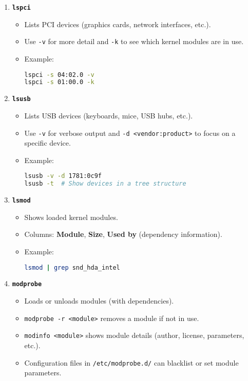 \documentclass[12pt,a4paper]{report}
\begin{document}
\begin{enumerate}
    \item \textbf{\texttt{lspci}}
    \begin{itemize}
        \item Lists PCI devices (graphics cards, network interfaces, etc.).
        \item Use \texttt{-v} for more detail and \texttt{-k} to see which kernel modules are in use.
        \item Example:
        \begin{lstlisting}[language=bash]
lspci -s 04:02.0 -v
lspci -s 01:00.0 -k
        \end{lstlisting}
    \end{itemize}

    \item \textbf{\texttt{lsusb}}
    \begin{itemize}
        \item Lists USB devices (keyboards, mice, USB hubs, etc.).
        \item Use \texttt{-v} for verbose output and \texttt{-d <vendor:product>} to focus on a specific device.
        \item Example:
        \begin{lstlisting}[language=bash]
lsusb -v -d 1781:0c9f
lsusb -t  # Show devices in a tree structure
        \end{lstlisting}
    \end{itemize}

    \item \textbf{\texttt{lsmod}}
    \begin{itemize}
        \item Shows loaded kernel modules.
        \item Columns: \textbf{Module}, \textbf{Size}, \textbf{Used by} (dependency information).
        \item Example:
        \begin{lstlisting}[language=bash]
lsmod | grep snd_hda_intel
        \end{lstlisting}
    \end{itemize}

    \item \textbf{\texttt{modprobe}}
    \begin{itemize}
        \item Loads or unloads modules (with dependencies).
        \item \texttt{modprobe -r <module>} removes a module if not in use.
        \item \texttt{modinfo <module>} shows module details (author, license, parameters, etc.).
        \item Configuration files in \texttt{/etc/modprobe.d/} can blacklist or set module parameters.
    \end{itemize}
\end{enumerate}
\end{document}

